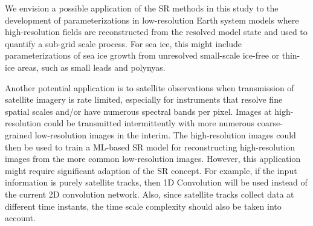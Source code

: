\documentclass[]{copernicus}
\begin{document}
We envision a possible application of the SR methods in this study to the development of parameterizations in low-resolution Earth system models where high-resolution fields are reconstructed from the resolved model state and used to quantify a sub-grid scale process. For sea ice, this might include parameterizations of sea ice growth from unresolved small-scale ice-free or thin-ice areas, such as small leads and polynyas.

Another potential application is to satellite observations when transmission of satellite imagery is rate limited, especially for instruments that resolve fine spatial scales and/or have numerous spectral bands per pixel. Images at high-resolution could be transmitted intermittently with more numerous coarse-grained low-resolution images in the interim. The high-resolution images could then be used to train a ML-based SR model for reconstructing high-resolution images from the more common low-resolution images. However, this application might require significant adaption of the SR concept. For example, if the input information is purely satellite tracks, then 1D Convolution will be used instead of the current 2D convolution network. Also, since satellite tracks collect data at different time instants, the time scale complexity should also be taken into account. 









\end{document}
